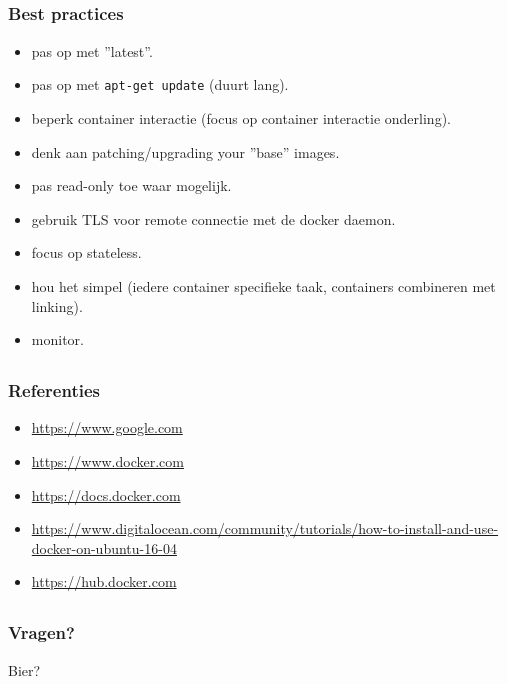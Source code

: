 \subsection{}
\begin{styleframefrag}
    \frametitle{Best practices}
\begin{itemize}
	\item pas op met ''latest''.
	\pause
	\item pas op met \verb!apt-get update! (duurt lang).
	\pause
	\item beperk container interactie (focus op container interactie onderling).
	\pause
	\item denk aan patching/upgrading your ''base'' images.
	\pause
	\item pas read-only toe waar mogelijk.
	\pause
	\item gebruik TLS voor remote connectie met de docker daemon.
	\pause
	\item focus op stateless.
	\pause
	\item hou het simpel (iedere container specifieke taak, containers combineren met linking).
	\pause
	\item monitor.
\end{itemize}
\end{styleframefrag}

\subsection{}
\begin{styleframe}
    \frametitle{Referenties}
\begin{itemize}
	\item \url{https://www.google.com}
	\item \url{https://www.docker.com}
	\item \url{https://docs.docker.com}
	\item \url{https://www.digitalocean.com/community/tutorials/how-to-install-and-use-docker-on-ubuntu-16-04}
	\item \url{https://hub.docker.com}
\end{itemize}
\end{styleframe}

\subsection{}
\begin{styleframe}
    \frametitle{Vragen?}
\begin{center}
\hspace{-20pt} \Huge Bier?
\end{center}
\end{styleframe}
